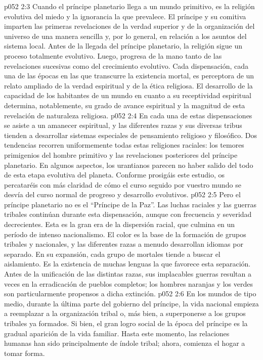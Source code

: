 \vs p052 2:3 Cuando el príncipe planetario llega a un mundo primitivo, es la religión evolutiva del miedo y la ignorancia la que prevalece. El príncipe y su comitiva imparten las primeras revelaciones de la verdad superior y de la organización del universo de una manera sencilla y, por lo general, en relación a los asuntos del sistema local. Antes de la llegada del príncipe planetario, la religión sigue un proceso totalmente evolutivo. Luego, progresa de la mano tanto de las revelaciones sucesivas como del crecimiento evolutivo. Cada dispensación, cada una de las épocas en las que transcurre la existencia mortal, es perceptora de un relato ampliado de la verdad espiritual y de la ética religiosa. El desarrollo de la capacidad de los habitantes de un mundo en cuanto a su receptividad espiritual determina, notablemente, su grado de avance espiritual y la magnitud de esta revelación de naturaleza religiosa.
\vs p052 2:4 En cada una de estas dispensaciones se asiste a un amanecer espiritual, y las diferentes razas y sus diversas tribus tienden a desarrollar sistemas especiales de pensamiento religioso y filosófico. Dos tendencias recorren uniformemente todas estas religiones raciales: los temores primigenios del hombre primitivo y las revelaciones posteriores del príncipe planetario. En algunos aspectos, los urantianos parecen no haber salido del todo de esta etapa evolutiva del planeta. Conforme prosigáis este estudio, os percataréis con más claridad de cómo el curso seguido por vuestro mundo se desvía del curso normal de progreso y desarrollo evolutivos.
\vs p052 2:5 \pc Pero el príncipe planetario no es el “Príncipe de la Paz”. Las luchas raciales y las guerras tribales continúan durante esta dispensación, aunque con frecuencia y severidad decrecientes. Esta es la gran era de la dispersión racial, que culmina en un período de intenso nacionalismo. El color es la base de la formación de grupos tribales y nacionales, y las diferentes razas a menudo desarrollan idiomas por separado. En su expansión, cada grupo de mortales tiende a buscar el aislamiento. Es la existencia de muchas lenguas la que favorece esta separación. Antes de la unificación de las distintas razas, sus implacables guerras resultan a veces en la erradicación de pueblos completos; los hombres naranjas y los verdes son particularmente propensos a dicha extinción.
\vs p052 2:6 En los mundos de tipo medio, durante la última parte del gobierno del príncipe, la vida nacional empieza a reemplazar a la organización tribal o, más bien, a superponerse a los grupos tribales ya formados. Si bien, el gran logro social de la época del príncipe es la gradual aparición de la vida familiar. Hasta este momento, las relaciones humanas han sido principalmente de índole tribal; ahora, comienza el hogar a tomar forma.
